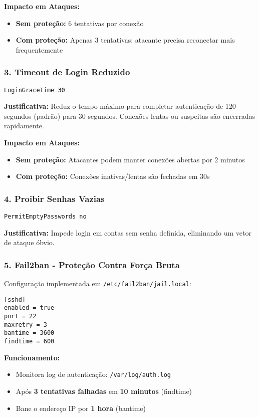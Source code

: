 \documentclass[12pt]{article}
\begin{document}
\textbf{Impacto em Ataques:}
\begin{itemize}
    \item \textbf{Sem proteção:} 6 tentativas por conexão
    \item \textbf{Com proteção:} Apenas 3 tentativas; atacante precisa reconectar mais frequentemente
\end{itemize}

\subsubsection{3. Timeout de Login Reduzido}
\begin{verbatim}
LoginGraceTime 30
\end{verbatim}

\textbf{Justificativa:} Reduz o tempo máximo para completar autenticação de 120 segundos (padrão) para 30 segundos. Conexões lentas ou suspeitas são encerradas rapidamente.

\textbf{Impacto em Ataques:}
\begin{itemize}
    \item \textbf{Sem proteção:} Atacantes podem manter conexões abertas por 2 minutos
    \item \textbf{Com proteção:} Conexões inativas/lentas são fechadas em 30s
\end{itemize}

\subsubsection{4. Proibir Senhas Vazias}
\begin{verbatim}
PermitEmptyPasswords no
\end{verbatim}

\textbf{Justificativa:} Impede login em contas sem senha definida, eliminando um vetor de ataque óbvio.

\subsubsection{5. Fail2ban - Proteção Contra Força Bruta}

Configuração implementada em \texttt{/etc/fail2ban/jail.local}:
\begin{verbatim}
[sshd]
enabled = true
port = 22
maxretry = 3
bantime = 3600
findtime = 600
\end{verbatim}

\textbf{Funcionamento:}
\begin{itemize}
    \item Monitora log de autenticação: \texttt{/var/log/auth.log}
    \item Após \textbf{3 tentativas falhadas} em \textbf{10 minutos} (findtime)
    \item Bane o endereço IP por \textbf{1 hora} (bantime)
\end{itemize}
\end{document}
